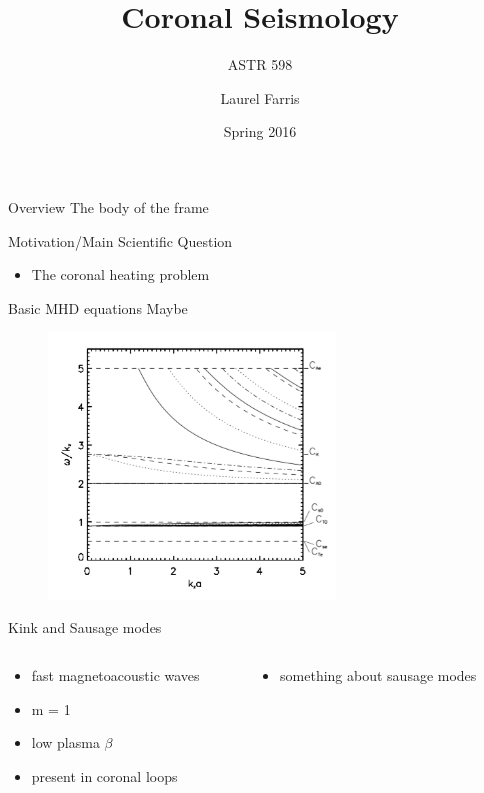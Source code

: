 \documentclass[table]{beamer}
\title{Coronal Seismology}
\subtitle{ASTR 598}
\date{Spring 2016}
\author{Laurel Farris}
\begin{document}
\begin{frame}
    \titlepage
\end{frame}

\begin{frame}{Overview}
    The body of the frame
\end{frame}

\begin{frame}{Motivation/Main Scientific Question}
    \begin{itemize}
        \item The coronal heating problem
    \end{itemize}
\end{frame}

\begin{frame}{Basic MHD equations}
    Maybe
\end{frame}

\begin{frame}
    \begin{figure}
        \includegraphics[width=3in]{disp_diagram.png}
    \end{figure}
\end{frame}

\begin{frame}{Kink and Sausage modes}

\begin{columns}
    \begin{column}{0.5\textwidth}
    \begin{itemize}
        \item fast magnetoacoustic waves
        \item m = 1
        \item low plasma $\beta$
        \item present in coronal loops
    \end{itemize}
    \end{column}
    \begin{column}{0.5\textwidth}  %
        \begin{itemize}
            \item something about sausage modes
        \end{itemize}
    \end{column}
\end{columns}
\end{frame}
\end{document}
